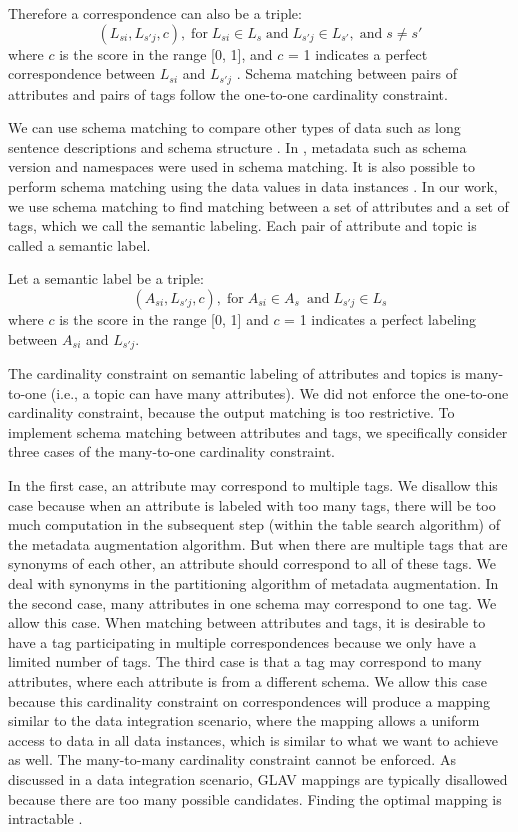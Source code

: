 Therefore a correspondence can also be a triple:
\[
(L_{si}, L_{s'j}, c), \; \textrm{for} \; L_{si}\in L_{s} \; \textrm{and} \; L_{s'j}\in L_{s'}, \; \textrm{and} \; s\neq s'
\]
where $c$ is the score in the range [0, 1], and $c$ = 1 indicates a perfect correspondence between $L_{si}$ and $L_{s'j}$ . Schema matching between pairs of attributes and pairs of tags follow the one-to-one cardinality constraint.

We can use schema matching to compare other types of data such as long sentence descriptions and schema structure \cite{Sorrentino2011NORMS}. In \cite{10.1145/1066157.1066283,Duchateau2009YAM}, metadata such as schema version and namespaces were used in schema matching. It is also possible to perform schema matching using the data values in data instances \cite{Rahm2001Survey}. In our work, we use schema matching to find matching between a set of attributes and a set of tags, which we call the semantic labeling. Each pair of attribute and topic is called a semantic label.

Let a semantic label be a triple:
\[
(A_{si}, L_{s'j}, c), \; \textrm{for} \; A_{si}\in A_{s}\ \; \textrm{and} \; L_{s'j}\in L_{s}
\]
where $c$ is the score in the range {[}0, 1{]} and $c$ = 1 indicates a perfect labeling between $A_{si}$ and $L_{s'j}$.

The cardinality constraint on semantic labeling of attributes and topics is many-to-one (i.e., a topic can have many attributes). We did not enforce the one-to-one cardinality constraint, because the output matching is too restrictive. To implement schema matching between attributes and tags, we specifically consider three cases of the many-to-one cardinality constraint.

In the first case, an attribute may correspond to multiple tags. We disallow this case because when an attribute is labeled with too many tags, there will be too much computation in the subsequent step (within the table search algorithm) of the metadata augmentation algorithm. But when there are multiple tags that are synonyms of each other, an attribute should correspond to all of these tags. We deal with synonyms in the partitioning algorithm of metadata augmentation. In the second case, many attributes in one schema may correspond to one tag. We allow this case. When matching between attributes and tags, it is desirable to have a tag participating in multiple correspondences because we only have a limited number of tags. The third case is that a tag may correspond to many attributes, where each attribute is from a different schema. We allow this case because this cardinality constraint on correspondences will produce a mapping similar to the data integration scenario, where the mapping allows a uniform access to data in all data instances, which is similar to what we want to achieve as well. The many-to-many cardinality constraint cannot be enforced. As discussed in a data integration scenario, GLAV mappings are typically disallowed because there are too many possible candidates. Finding the optimal mapping is intractable \cite{Ehrig2004QOM}.

